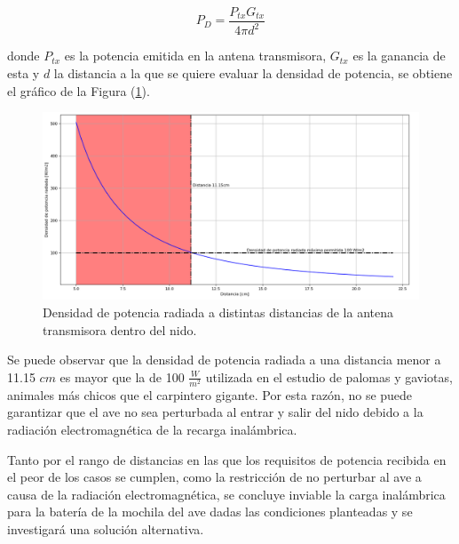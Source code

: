 \begin{equation}
P_D = \frac{P_{tx}G_{tx}}{4\pi d^2}
\end{equation}

donde $P_{tx}$ es la potencia emitida en la antena transmisora, $G_{tx}$ es la ganancia de esta y $d$ la distancia a la que se quiere evaluar la densidad de potencia, se obtiene el gráfico de la Figura (\ref{fig:antenas_densidad_radiada}). 

\begin{figure}[H]
	\centering
	\includegraphics[width=\linewidth]{ImagenesFactibilidad/antenas_densidad_radiada}
	\caption{Densidad de potencia radiada a distintas distancias de la antena transmisora dentro del nido.}
	\label{fig:antenas_densidad_radiada}
\end{figure}

Se puede observar que la densidad de potencia radiada a una distancia menor a 11.15 $cm$ es mayor que la de 100 $\frac{W}{m^2}$ utilizada en el estudio de palomas y gaviotas\cite{ref:effect-radiation}, animales más chicos que el carpintero gigante. Por esta razón, no se puede garantizar que el ave no sea perturbada al entrar y salir del nido debido a la radiación electromagnética de la recarga inalámbrica.


Tanto por el rango de distancias en las que los requisitos de potencia recibida en el peor de los casos se cumplen, como la restricción de no perturbar al ave a causa de la radiación electromagnética, se concluye inviable la carga inalámbrica para la batería de la mochila del ave dadas las condiciones planteadas y se investigará una solución alternativa.